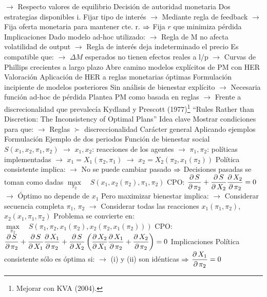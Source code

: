 \documentclass{nuevotema}
\begin{document}
\begin{esquemal}
				\4[] $\to$ Respecto valores de equilibrio
				\4 Decisión de autoridad monetaria
				\4[] Dos estrategias disponibles
				\4[] i. Fijar tipo de interés
				\4[] $\to$ Mediante regla de feedback
				\4[] $\to$ Fija oferta monetaria para mantener cte. r.
				\4[] $\Rightarrow$ Fija $r$ que minimiza pérdida
				\4 Implicaciones
				\4[] Dado modelo ad-hoc utilizado:
				\4[] $\to$ Regla de M no afecta volatilidad de output
				\4[] $\to$ Regla de interés deja indeterminado el precio
				\4[] Es compatible que:
				\4[] $\to$ $\Delta M$ esperados no tienen efectos reales a l/p
				\4[] $\to$ Curvas de Phillips crecientes a largo plazo
				\4[] Abre camino modelos explícitos de PM con HER
				\4 Valoración
				\4[] Aplicación de HER a reglas monetarias óptimas
				\4[] Formulación incipiente de modelos posteriores
				\4[] Sin análisis de bienestar explícito
				\4[] $\to$ Necesaria función ad-hoc de pérdida
				\4[] Plantea PM como basada en reglas
				\4[] $\to$ Frente a discrecionalidad que prevalecía
			\3 Kydland y Prescott (1977)\footnote{Mejorar con KVA (2004).}
				\4 ``Rules Rather than Discretion: The Inconsistency of Optimal Plans''
				\4 Idea clave
				\4[] Mostrar condiciones para que:
				\4[] $\to$ Reglas $\succ$ discreccionalidad
				\4[] Carácter general
				\4[] Aplicando ejemplos
				\4 Formulación
				\4[] Ejemplo de dos periodos
				\4[] Función de bienestar social $S(x_1, x_2, \pi_1, \pi_2)$
				\4[] $\to$ $x_1, x_2$: reacciones de los agentes
				\4[] $\to$ $\pi_1, \pi_2$: políticas implementadas
				\4[] $\to$ $x_1 = X_1(\pi_2, \pi_1)$
				\4[] $\to$ $x_2 = X_2(\pi_2, x_1(\pi_2))$
				\4[] Política consistente implica:
				\4[] $\to$ No se puede cambiar pasado
				\4[] $\Rightarrow$ Decisiones pasadas se toman como dadas
				\4[] $\underset{\pi_2}{\max} \quad S(x_1, x_2(\pi_2), \pi_1, \pi_2)$
				\4[(i)] $\text{CPO:}$ $\dfrac{\partial \, S}{\partial \, \pi_2} + \dfrac{\partial \, S}{\partial \, X_2}\dfrac{\partial \, X_2}{\partial \, \pi_2}=0$
				\4[] $\to$ Óptimo no depende de $x_1$
				\4[] Pero maximizar bienestar implica:
				\4[] $\to$ Considerar secuencia completa $\pi_1$, $\pi_2$
				\4[] $\to$ Considerar todas las reacciones $x_1(\pi_1, \pi_2)$, $x_2(x_1, \pi_1, \pi_2)$
				\4[] Problema se convierte en:
				\4[] $\underset{\pi_2}{\max} \quad S\left(\pi_1, \pi_2, x_1(\pi_2), x_2 \left( \pi_2, x_1 (\pi_2) \right) \right)$
				\4[(ii)] $\text{CPO:}$ $\dfrac{\partial \, S}{\partial \, \pi_2} + \dfrac{\partial \, S}{\partial \, X_1} \dfrac{\partial \, X_1}{\partial \, \pi_2} + \dfrac{\partial \, S}{\partial \, X_2} \left( \dfrac{\partial \, X_2}{\partial \, X_1} \dfrac{\partial \, X_1}{\partial \, \pi_2} + \dfrac{\partial \, X_2}{\partial \, \pi_2} \right) =0$
				\4 Implicaciones
				\4[] Política consistente sólo es óptima si:
				\4[] $\to$ (i) y (ii) son idénticas
				\4[] $\Rightarrow$ $\dfrac{\partial \, X_1}{\partial \, \pi_2} = 0$

\end{esquemal}
\end{document}
